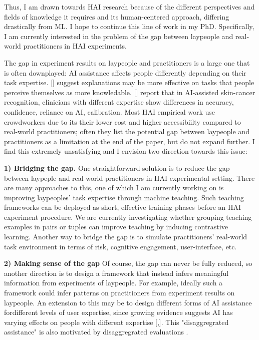 


Thus, I am drawn towards HAI research because of the different perspectives and fields of knowledge it requires and its human-centered approach, differing drastically from ML. 
I hope to continue this line of work in my PhD.
Specifically, I am currently interested in the problem of the gap between laypeople and real-world practitioners in HAI experiments.

The gap in experiment results on laypeople and practitioners is a large one that is often downplayed: AI assistance affects people differently depending on their task expertise. [] suggest explanations may be more effective on tasks that people perceive themselves as more knowledable. [] report that in AI-assisted skin-cancer recognition, clinicians with different expertise show differences in accuracy, confidence, reliance on AI, calibration. 
Most HAI empirical work use crowdworkers due to its their lower cost and higher accessibiilty compared to real-world practitioners; 
often they list the potential gap between laypeople and practitioners as a limitation at the end of the paper, but do not expand further. 
I find this extremely unsatisfying and I envision two direction towards this issue:

\textbf{1) Bridging the gap.}
One straightforward solution is to reduce the gap between laypeple and real-world practitioners in HAI experimental setting. 
There are many approaches to this, one of which I am currently working on is improving laypeoples' task expertise through machine teaching. 
Such teaching frameworks can be deployed as short, effective training phases before an HAI experiment procedure. 
We are currently investigating whether grouping teaching examples in pairs or tuples can improve teaching by inducing contrastive learning.
Another way to bridge the gap is to simulate practitioners' real-world task environment in terms of risk, cognitive engagement, user-interface, etc.


\textbf{2) Making sense of the gap}
Of course, the gap can never be fully reduced, so another direction is to design a framework that instead infers meaningful information from experiments of laypeople. 
For example, ideally such a framework could infer patterns on practitioners from experiment results on laypeople.
An extension to this may be to design different forms of AI assistance fordifferent levels of user expertise, since growing evidence suggests AI has varying effects on people with different expertise [,]. 
This "disaggregrated assistance" is also motivated by disaggregrated evaluations
.




